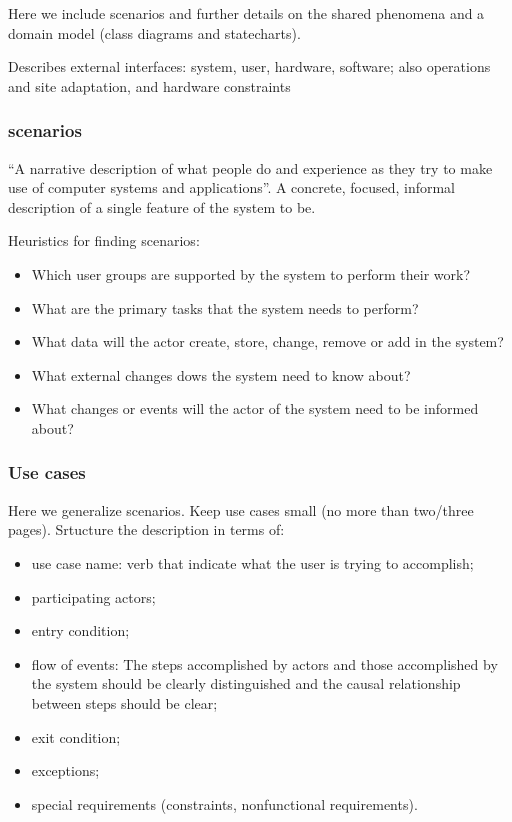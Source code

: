 Here we include scenarios and further details on the shared phenomena and a domain model (class diagrams and statecharts).

Describes external interfaces: system, user, hardware, software; also operations and site adaptation, and hardware constraints

\subsubsection{scenarios}
\label{subsubsect:scenarios}

“A narrative description of what people do and experience as they try to make use of computer systems and applications”.
A concrete, focused, informal description of a single feature of the system to be.

Heuristics for finding scenarios:
\begin{itemize}
    \item Which user groups are supported by the system to perform their work?
    \item What are the primary tasks that the system needs to perform?
    \item What data will the actor create, store, change, remove or add in the system?
    \item What external changes dows the system need to know about?
    \item What changes or events will the actor of the system need to be informed about?
\end{itemize}

\subsubsection{Use cases}
\label{subsubsect:usecases}

Here we generalize scenarios. Keep use cases small (no more than two/three pages).
Srtucture the description in terms of:
\begin{itemize}
    \item use case name: verb that indicate what the user is trying     to accomplish;
    \item participating actors;
    \item entry condition;
    \item flow of events: The steps accomplished by actors and those accomplished by the system should be clearly distinguished and the causal relationship between steps should be clear;
    \item exit condition;
    \item exceptions;
    \item special requirements (constraints, nonfunctional requirements).
\end{itemize}


